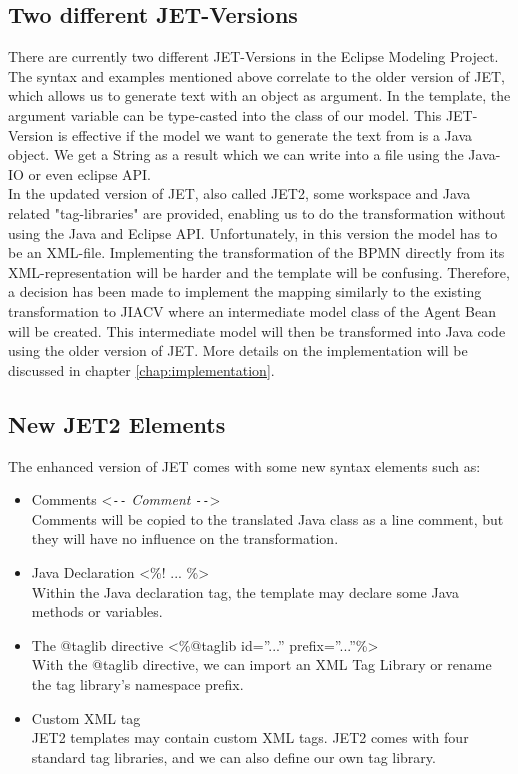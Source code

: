 \subsection{Two different JET-Versions}
There are currently two different JET-Versions in the Eclipse Modeling Project. The syntax and examples mentioned above correlate to the older version of JET, which allows us to generate text with an object as argument. In the template, the argument variable can be type-casted into the class of our model. This JET-Version is effective if the model we want to generate the text from is a Java object. We get a String as a result which we can write into a file using the Java-IO or even eclipse API.\\

In the updated version of JET, also called JET2, some workspace and Java related "tag-libraries" are provided, enabling us to do the transformation without using the Java and Eclipse API. Unfortunately, in this version the model has to be an XML-file.
Implementing the transformation of the BPMN directly from its XML-representation will be harder and the template will be confusing. Therefore, a decision has been made to implement the mapping similarly to the existing transformation to JIACV where an intermediate model class of the Agent Bean will be created. This intermediate model will then be transformed into Java code using the older version of JET.
More details on the implementation will be discussed in chapter \ref{chap:implementation}.

\subsection{New JET2 Elements}
The enhanced version of JET comes with some new syntax elements such as:
\begin{itemize}
	\item Comments <\verb|--| \textit{Comment} \verb|--|>\\
	      Comments will be copied to the translated Java class as a line comment, but they will have no influence on the transformation.
	\item Java Declaration <\%! ... \%>\\
	      Within the Java declaration tag, the template may declare some Java methods or variables.
	\item The @taglib directive <\%@taglib id=''...'' prefix=''...''\%>\\
	      With the @taglib directive, we can import an XML Tag Library or rename the tag library's namespace prefix.
	\item Custom XML tag\\
	   		JET2 templates may contain custom XML tags. JET2 comes with four standard tag libraries, and we can also define our own tag library.				
\end{itemize}


